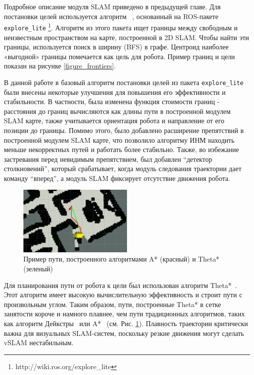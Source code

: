 \documentclass{mipt-thesis-ms}
\begin{document}
	Подробное описание модуля SLAM приведено в предыдущей главе. Для постановки целей используется алгоритм ~\cite{Horner2016}, основанный на ROS-пакете \texttt{explore\_lite} \footnote{http://wiki.ros.org/explore\_lite}. Алгоритм из этого пакета ищет границы между свободным и неизвестным пространством на карте, построенной в 2D SLAM. Чтобы найти эти границы, используется поиск в ширину (BFS) в графе. Центроид наиболее «выгодной» границы помечается как цель для робота. Пример границ и цели показан на рисунке \ref{figure_frontiers}.
	
	В данной работе в базовый алгоритм постановки целей из пакета \texttt{explore\_lite} были внесены некоторые улучшения для повышения его эффективности и стабильности. В частности, была изменена функция стоимости границ - расстояния до границ вычисляются как длины пути в построенной модулем SLAM карте, также учитывается ориентация робота и направление от его позиции до границы. Помимо этого, было добавлено расширение препятствий в построенной модулем SLAM карте, что позволило алгоритму ИНМ находить меньше некорректных путей и работать более стабильно. Также, во избежание застревания перед невидимым препятствием, был добавлен ``детектор столкновений'', который срабатывает, когда модуль следования траектории дает команду ``вперед'', а модуль SLAM фиксирует отсутствие движения робота.
	
	\begin{figure}
		\centering
		\includegraphics[width=0.5\textwidth]{img/paths_truncated.png}
		\caption{Пример пути, построенного алгоритмами A* (красный) и Theta* (зеленый) }
		\label{figure_thetastar_path}
	\end{figure}
	
	Для планирования пути от робота к цели был использован алгоритм Theta*~\cite{nash2007theta}. Этот алгоритм имеет высокую вычислительную эффективность и строит пути с произвольным углом. Таким образом, пути, построенные Theta* в сетке занятости короче и намного плавнее, чем пути традиционных алгоритмов, таких как алгоритм Дейкстры~\cite{dijkstra1959note} или A*~\cite{hart1968formal} (см. Рис. \ref{figure_thetastar_path}). Плавность траектории критически важна для визуальных SLAM-систем, поскольку резкие движения могут сделать vSLAM нестабильным.
	
\end{document}
